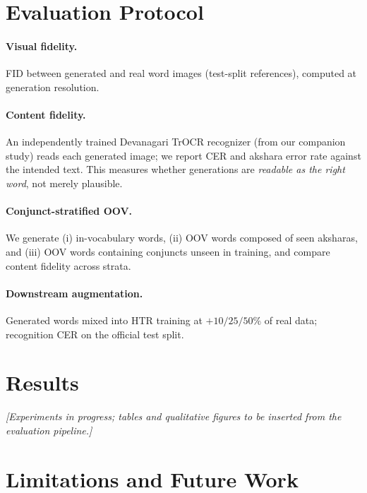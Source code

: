 \documentclass{llncs}
\begin{document}
\section{Evaluation Protocol}

\paragraph{Visual fidelity.} FID between generated and real word images
(test-split references), computed at generation resolution.
\paragraph{Content fidelity.} An independently trained Devanagari TrOCR
recognizer (from our companion study) reads each generated image; we report
CER and akshara error rate against the intended text. This measures whether
generations are \emph{readable as the right word}, not merely plausible.
\paragraph{Conjunct-stratified OOV.} We generate (i) in-vocabulary words,
(ii) OOV words composed of seen aksharas, and (iii) OOV words containing
conjuncts unseen in training, and compare content fidelity across strata.
\paragraph{Downstream augmentation.} Generated words mixed into HTR
training at $+10/25/50\%$ of real data; recognition CER on the official
test split.

\section{Results}

\emph{[Experiments in progress; tables and qualitative figures to be
inserted from the evaluation pipeline.]}

\section{Limitations and Future Work}
\label{sec:future}
\end{document}
